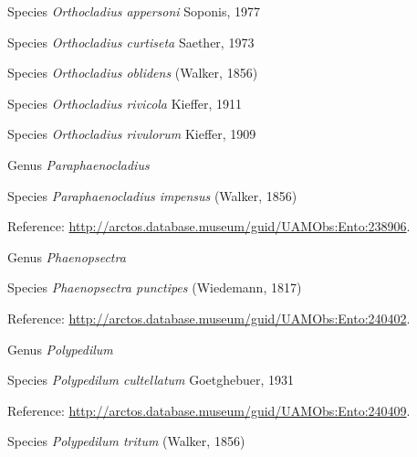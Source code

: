 \documentclass[9pt, article]{memoir}
\begin{document}
\begin{multicols}{2}
\vspace{6pt}\noindent\hspace{36pt}Species \textit{Orthocladius appersoni} Soponis, 1977


\vspace{6pt}\noindent\hspace{36pt}Species \textit{Orthocladius curtiseta} Saether, 1973


\vspace{6pt}\noindent\hspace{36pt}Species \textit{Orthocladius oblidens} (Walker, 1856)


\vspace{6pt}\noindent\hspace{36pt}Species \textit{Orthocladius rivicola} Kieffer, 1911


\vspace{6pt}\noindent\hspace{36pt}Species \textit{Orthocladius rivulorum} Kieffer, 1909


\vspace{6pt}\noindent\hspace{30pt}Genus \textit{Paraphaenocladius}


\vspace{6pt}\noindent\hspace{36pt}Species \textit{Paraphaenocladius impensus} (Walker, 1856)


Reference: 
\url{http://arctos.database.museum/guid/UAMObs:Ento:238906}.

\vspace{6pt}\noindent\hspace{30pt}Genus \textit{Phaenopsectra}


\vspace{6pt}\noindent\hspace{36pt}Species \textit{Phaenopsectra punctipes} (Wiedemann, 1817)


Reference: 
\url{http://arctos.database.museum/guid/UAMObs:Ento:240402}.

\vspace{6pt}\noindent\hspace{30pt}Genus \textit{Polypedilum}


\vspace{6pt}\noindent\hspace{36pt}Species \textit{Polypedilum cultellatum} Goetghebuer, 1931


Reference: 
\url{http://arctos.database.museum/guid/UAMObs:Ento:240409}.

\vspace{6pt}\noindent\hspace{36pt}Species \textit{Polypedilum tritum} (Walker, 1856)



\end{multicols}
\end{document}
